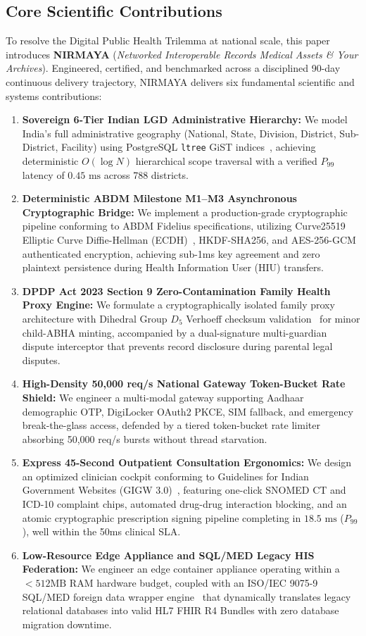 \documentclass[journal,twocolumn]{IEEEtran}
\begin{document}
\subsection{Core Scientific Contributions}
To resolve the Digital Public Health Trilemma at national scale, this paper introduces \textbf{NIRMAYA} (\emph{Networked Interoperable Records Medical Assets \& Your Archives}). Engineered, certified, and benchmarked across a disciplined 90-day continuous delivery trajectory, NIRMAYA delivers six fundamental scientific and systems contributions:

\begin{enumerate}
    \item \textbf{Sovereign 6-Tier Indian LGD Administrative Hierarchy:} We model India's full administrative geography (National, State, Division, District, Sub-District, Facility) using PostgreSQL \texttt{ltree} GiST indices~\cite{bartunov_ltree}, achieving deterministic $O(\log N)$ hierarchical scope traversal with a verified $P_{99}$ latency of $0.45\text{ ms}$ across 788 districts.
    \item \textbf{Deterministic ABDM Milestone M1--M3 Asynchronous Cryptographic Bridge:} We implement a production-grade cryptographic pipeline conforming to ABDM Fidelius specifications, utilizing Curve25519 Elliptic Curve Diffie-Hellman (ECDH)~\cite{bernstein_curve25519}, HKDF-SHA256, and AES-256-GCM authenticated encryption, achieving sub-1ms key agreement and zero plaintext persistence during Health Information User (HIU) transfers.
    \item \textbf{DPDP Act 2023 Section 9 Zero-Contamination Family Health Proxy Engine:} We formulate a cryptographically isolated family proxy architecture with Dihedral Group $D_5$ Verhoeff checksum validation~\cite{verhoeff_checksum} for minor child-ABHA minting, accompanied by a dual-signature multi-guardian dispute interceptor that prevents record disclosure during parental legal disputes.
    \item \textbf{High-Density 50,000 req/s National Gateway Token-Bucket Rate Shield:} We engineer a multi-modal gateway supporting Aadhaar demographic OTP, DigiLocker OAuth2 PKCE, SIM fallback, and emergency break-the-glass access, defended by a tiered token-bucket rate limiter absorbing 50,000 req/s bursts without thread starvation.
    \item \textbf{Express 45-Second Outpatient Consultation Ergonomics:} We design an optimized clinician cockpit conforming to Guidelines for Indian Government Websites (GIGW 3.0)~\cite{gigw_3_0}, featuring one-click SNOMED CT and ICD-10 complaint chips, automated drug-drug interaction blocking, and an atomic cryptographic prescription signing pipeline completing in $18.5\text{ ms}$ ($P_{99}$), well within the 50ms clinical SLA.
    \item \textbf{Low-Resource Edge Appliance and SQL/MED Legacy HIS Federation:} We engineer an edge container appliance operating within a $< 512\text{MB}$ RAM hardware budget, coupled with an ISO/IEC 9075-9 SQL/MED foreign data wrapper engine~\cite{iso_sql_med} that dynamically translates legacy relational databases into valid HL7 FHIR R4 Bundles with zero database migration downtime.
\end{enumerate}
\end{document}
